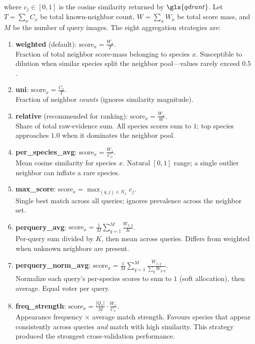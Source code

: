 where $c_j \in [0,1]$ is the cosine similarity returned by $\gls{qdrant}$. Let $T = \sum_x C_x$ be total known-neighbor count, $W = \sum_x W_x$ be total score mass, and $M$ be the number of query images. The eight aggregation strategies are:

\begin{enumerate}[font=\bfseries,label=\textbf{\arabic*.}]
\item \textbf{weighted} (default): $\displaystyle \mathrm{score}_x = \frac{W_x}{T}$.\\
Fraction of total neighbor score-mass belonging to species $x$. Susceptible to dilution when similar species split the neighbor pool---values rarely exceed $0.5$.

\item \textbf{uni}: $\displaystyle \mathrm{score}_x = \frac{C_x}{T}$.\\
Fraction of neighbor \emph{counts} (ignores similarity magnitude).

\item \textbf{relative} (recommended for ranking): $\displaystyle \mathrm{score}_x = \frac{W_x}{W}$.\\
Share of total raw-evidence sum. All species scores sum to $1$; top species approaches $1.0$ when it dominates the neighbor pool.

\item \textbf{per\_species\_avg}: $\displaystyle \mathrm{score}_x = \frac{W_x}{C_x}$.\\
Mean cosine similarity for species $x$. Natural $[0,1]$ range; a single outlier neighbor can inflate a rare species.

\item \textbf{max\_score}: $\displaystyle \mathrm{score}_x = \max_{(q,j) \in N_x} c_j$.\\
Single best match across all queries; ignores prevalence across the neighbor set.

\item \textbf{perquery\_avg}: $\displaystyle \mathrm{score}_x = \frac{1}{M} \sum_{q=1}^M \frac{W_{x,q}}{K}$.\\
Per-query sum divided by $K$, then mean across queries. Differs from weighted when unknown neighbors are present.

\item \textbf{perquery\_norm\_avg}: $\displaystyle \mathrm{score}_x = \frac{1}{M} \sum_{q=1}^M \frac{W_{x,q}}{\sum_{y} W_{y,q}}$.\\
Normalize each query's per-species scores to sum to $1$ (soft allocation), then average. Equal voter per query.

\item \textbf{freq\_strength}: $\displaystyle \mathrm{score}_x = \frac{|Q_x|}{M} \cdot \frac{W_x}{C_x}$.\\
Appearance frequency $\times$ average match strength. Favours species that appear consistently across queries \emph{and} match with high similarity. This strategy produced the strongest cross-validation performance.
\end{enumerate}

